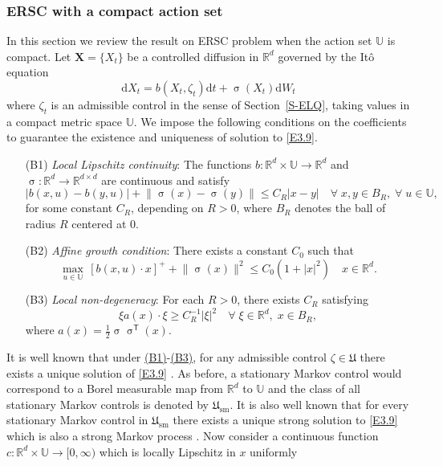 \documentclass[notitlepage,11pt,reqno]{amsart}
\numberwithin{equation}{section}
\theoremstyle{plain}
\theoremstyle{definition}
\theoremstyle{remark}
\newcommand{\Act}{{\mathds{U}}}
\newcommand{\Uadm}{\mathfrak{U}}
\newcommand{\Usm}{\mathfrak{U}_{\mathrm{sm}}}
\newcommand{\RR}{\mathds{R}} %
\newcommand{\Rd}{{\mathds{R}^{d}}}
\newcommand{\D}{\mathrm{d}} %
\newcommand{\abs}[1]{\lvert#1\rvert}
\newcommand{\norm}[1]{\lVert#1\rVert}
\newcommand{\transp}{^{\mathsf{T}}}
\begin{document}
\subsubsection{ERSC with a compact action set}
In this section we review the result on ERSC problem when the action set $\Act$ is compact. Let $\textbf{X}=\{X_t\}$ be a controlled diffusion in $\Rd$ 
governed by the It\^{o} equation
\begin{equation}\label{E3.9}
\D{X}_t = b(X_t, \zeta_t)\D{t} + \upsigma(X_t) \D{W}_t
\end{equation}
where $\zeta_t$ is an admissible control in the sense of Section~\ref{S-ELQ}, taking values in a compact metric space $\Act$. We impose the following conditions on the coefficients
to guarantee the existence and uniqueness of solution to \eqref{E3.9}.
\begin{itemize}
\item[\hypertarget{B1}{{(B1)}}] {\it Local Lipschitz continuity}: The functions $b:\Rd\times\Act\to\Rd$ and $\upsigma:\Rd\to\RR^{d\times d}$ are continuous and satisfy
\begin{equation*}
\abs{b(x, u)-b(y, u)} + \norm{\upsigma(x)-\upsigma(y)}\leq C_R |x-y|\quad \forall \; x, y\in B_R,\; \forall\; u\in\Act,
\end{equation*}
for some constant $C_R$, depending on $R>0$, where $B_R$ denotes the ball of radius $R$ centered at $0$.
\item[\hypertarget{B2}{{(B2)}}] {\it Affine growth condition}: There exists a constant $C_0$ such that
$$\max_{u\in\Act}\, [b(x, u)\cdot x]^+ + \norm{\upsigma(x)}^2\leq C_0(1+|x|^2)\quad x\in\Rd.$$

\item[\hypertarget{B3}{{(B3)}}] {\it Local non-degeneracy}: For each $R>0$, there exists $C_R$ satisfying
$$\xi a(x) \cdot \xi\geq C^{-1}_R |\xi|^2\quad \forall\; \xi\in\Rd, \; x\in B_R,$$
where $a(x)=\frac{1}{2}\upsigma\upsigma\transp(x)$.
\end{itemize}
It is well known that under \hyperlink{B1}{(B1)}-\hyperlink{B3}{(B3)}, for any admissible control $\zeta\in\Uadm$ there exists a unique solution of \eqref{E3.9}
\cite[Theorem~2.2.4]{red-book}. As before, a stationary Markov control would correspond to a Borel measurable map from $\Rd$ to $\Act$ and the class of all
stationary Markov controls is denoted by $\Usm$. It is also well known that for every stationary Markov control in $\Usm$ there exists a unique strong solution
to \eqref{E3.9} which is also a strong Markov process \cite{MR0336813,MR568986,MR1392450}. Now consider a continuous function $c:\Rd\times\Act\to [0, \infty)$ which is locally Lipschitz in $x$ uniformly 
\end{document}
